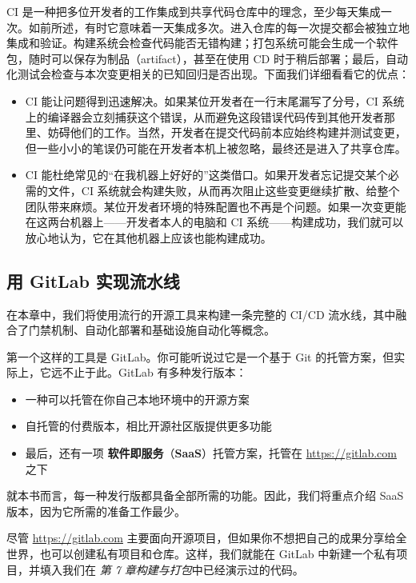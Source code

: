 \label{idx:899}
CI 是一种把多位开发者的工作集成到共享代码仓库中的理念，至少每天集成一次。如前所述，有时它意味着一天集成多次。进入仓库的每一次提交都会被独立地集成和验证。构建系统会检查代码能否无错构建；打包系统可能会生成一个软件包，随时可以保存为制品（artifact），甚至在使用 CD 时于稍后部署；最后，自动化测试会检查与本次变更相关的已知回归是否出现。下面我们详细看看它的优点：

\begin{itemize}
\item CI 能让问题得到迅速解决。如果某位开发者在一行末尾漏写了分号，CI 系统上的编译器会立刻捕获这个错误，从而避免这段错误代码传到其他开发者那里、妨碍他们的工作。当然，开发者在提交代码前本应始终构建并测试变更，但一些小小的笔误仍可能在开发者本机上被忽略，最终还是进入了共享仓库。
\item CI 能杜绝常见的“在我机器上好好的”这类借口。如果开发者忘记提交某个必需的文件，CI 系统就会构建失败，从而再次阻止这些变更继续扩散、给整个团队带来麻烦。某位开发者环境的特殊配置也不再是个问题。如果一次变更能在这两台机器上——开发者本人的电脑和 CI 系统——构建成功，我们就可以放心地认为，它在其他机器上应该也能构建成功。
\end{itemize}

\subsection{用 GitLab 实现流水线}

\label{idx:900}
在本章中，我们将使用流行的开源工具来构建一条完整的 CI/CD 流水线，其中融合了门禁机制、自动化部署和基础设施自动化等概念。

第一个这样的工具是 GitLab。你可能听说过它是一个基于 Git 的托管方案，但实际上，它远不止于此。GitLab 有多种发行版本：

\begin{itemize}
\item 一种可以托管在你自己本地环境中的开源方案
\item 自托管的付费版本，相比开源社区版提供更多功能
\label{idx:901}
\item 最后，还有一项 \textbf{软件即服务}（\textbf{SaaS}）托管方案，托管在 \href{https://about.gitlab.com/}{https://gitlab.com} 之下
\end{itemize}

就本书而言，每一种发行版都具备全部所需的功能。因此，我们将重点介绍 SaaS 版本，因为它所需的准备工作最少。

尽管 \href{https://gitlab.com}{https://gitlab.com} 主要面向开源项目，但如果你不想把自己的成果分享给全世界，也可以创建私有项目和仓库。这样，我们就能在 GitLab 中新建一个私有项目，并填入我们在 \emph{第 7 章}\emph{构建与打包}中已经演示过的代码。

